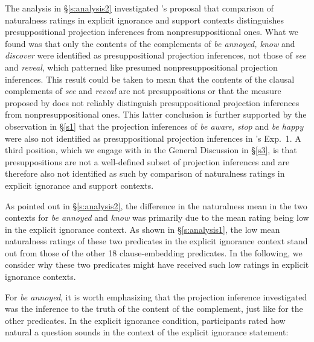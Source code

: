 \documentclass[11pt,fleqn]{article}
\newcommand{\6}{\mbox{$[\hspace*{-.6mm}[$}}
\newcommand{\9}{\mbox{$]\hspace*{-.6mm}]$}}
\newcommand{\citepos}[1]{\citeauthor{#1}'s \citeyear{#1}}
\begin{document}
The analysis in \S\ref{s:analysis2} investigated \citepos{mandelkern-etal2020} proposal that comparison of naturalness ratings in explicit ignorance and support contexts distinguishes presuppositional projection inferences from nonpresuppositional ones. What we found was that only the contents of the complements of \emph{be annoyed, know} and \emph{discover} were identified as presuppositional projection inferences, not those of \emph{see} and \emph{reveal}, which patterned like presumed nonpresuppositional projection inferences. This result could be taken to mean that the contents of the clausal complements of \emph{see} and \emph{reveal} are not presuppositions or that the measure proposed by \citealt{mandelkern-etal2020} does not reliably distinguish presuppositional projection inferences from nonpresuppositional ones. This latter conclusion is further supported by the observation in \S\ref{s1} that  the projection inferences of \emph{be aware, stop} and \emph{be happy} were also not identified as presuppositional projection inferences in \citepos{kalomoiros-schwarz2024} Exp.~1. A third position, which we engage with in the General Discussion in \S\ref{s3}, is that presuppositions are not a well-defined subset of projection inferences and are therefore also not identified as such by comparison of naturalness ratings in explicit ignorance and support contexts.

As pointed out in \S\ref{s:analysis2}, the difference in the naturalness mean in the two contexts for \emph{be annoyed} and \emph{know} was primarily due to the mean rating being low in the explicit ignorance context. As shown in \S\ref{s:analysis1}, the low mean naturalness ratings of these two predicates in the explicit ignorance context stand out from those of the other 18 clause-embedding predicates. In the following, we consider why these two predicates might have received such low ratings in explicit ignorance contexts. 

For \emph{be annoyed}, it is worth emphasizing that the projection inference investigated was the inference to the truth of the content of the complement, just like for the other predicates. In the explicit ignorance condition, participants rated how natural a question sounds in the context of the explicit ignorance statement:
\end{document}
